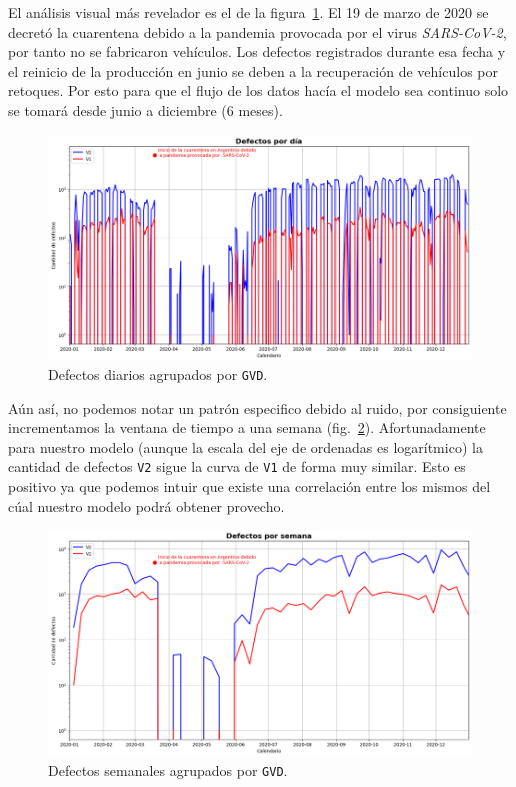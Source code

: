 \documentclass[a4paper,12pt]{article}
\begin{document}
		\clearpage
				
		El análisis visual más revelador es el de la figura~\ref{fig:defectsperday}. El 19 de marzo de 2020 se decretó la cuarentena debido a la pandemia provocada por el virus \textit{SARS-CoV-2}, por tanto no se fabricaron vehículos. Los defectos registrados durante esa fecha y el reinicio de la producción en junio se deben a la recuperación de vehículos por retoques. Por esto para que el flujo de los datos hacía el modelo sea continuo solo se tomará desde junio a diciembre (6 meses).
				
		\begin{figure}[H]
			\begin{center}
				\includegraphics[width=1\textwidth]{tesis_64.png}
				\caption{Defectos diarios agrupados por \texttt{GVD}.}
				\label{fig:defectsperday}
			\end{center}
		\end{figure}
				
		\clearpage
				
		Aún así, no podemos notar un patrón especifico debido al ruido, por consiguiente incrementamos la ventana de tiempo a una semana (fig.~\ref{fig:defectsperweek}). Afortunadamente para nuestro modelo (aunque la escala del eje de ordenadas es logarítmico) la cantidad de defectos \texttt{V2} sigue la curva de \texttt{V1} de forma muy similar. Esto es positivo ya que podemos intuir que existe una correlación entre los mismos del cúal nuestro modelo podrá obtener provecho.
				
		\begin{figure}[H]
			\begin{center}
				\includegraphics[width=1\textwidth]{tesis_63.png}
				\caption{Defectos semanales agrupados por \texttt{GVD}.}
				\label{fig:defectsperweek}
			\end{center}
		\end{figure}
				
\end{document}
